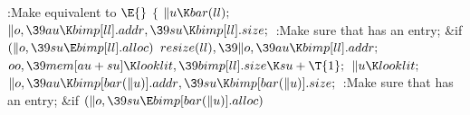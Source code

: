 \Y\B\4:Make  equivalent to \X${}\E{}$\6
${}\{{}$\1\6
${}\|u\K\\{bar}(\\{ll});{}$\6
${}\|o,\39\\{au}\K\\{bimp}[\\{ll}].\\{addr},\39\\{su}\K\\{bimp}[\\{ll}].%
\\{size};{}$\6
:Make sure that  has an  entry\X;\6
\&{if} ${}(\|o,\39\\{su}\E\\{bimp}[\\{ll}].\\{alloc}){}$\1\5
${}\\{resize}(\\{ll}),\39\|o,\39\\{au}\K\\{bimp}[\\{ll}].\\{addr};{}$\2\6
${}\\{oo},\39\\{mem}[\\{au}+\\{su}]\K\\{looklit},\39\\{bimp}[\\{ll}].\\{size}\K%
\\{su}+\T{1};{}$\6
${}\|u\K\\{looklit};{}$\6
${}\|o,\39\\{au}\K\\{bimp}[\\{bar}(\|u)].\\{addr},\39\\{su}\K\\{bimp}[\\{bar}(%
\|u)].\\{size};{}$\6
:Make sure that  has an  entry\X;\6
\&{if} ${}(\|o,\39\\{su}\E\\{bimp}[\\{bar}(\|u)].\\{alloc}){}$\1\5
